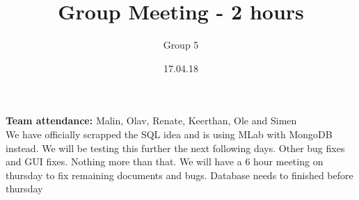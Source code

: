 \documentclass{article}
\title{Group Meeting - 2 hours}
\author{Group 5}
\date{17.04.18}
\begin{document}
	\maketitle
	\noindent
	\textbf{Team attendance:} Malin, Olav, Renate, Keerthan, Ole and Simen \\

	\noindent
	We have officially scrapped the SQL idea and is using MLab with MongoDB instead. We will be testing this further the next following days.
	Other bug fixes and GUI fixes. Nothing more than that. We will have a 6 hour meeting on thursday to fix remaining documents and bugs. Database needs to finished before thursday
\end{document}
